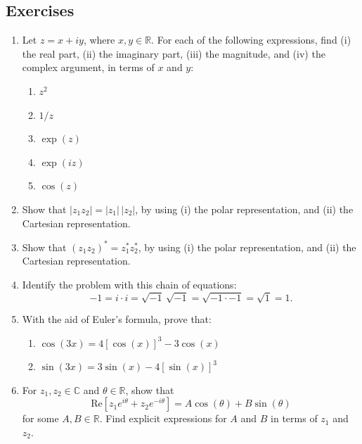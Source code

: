 \documentclass[10pt,a4paper]{article}
\begin{document}
     
\subsection{Exercises}

\begin{enumerate}
\item
  Let $z = x + iy$, where $x, y \in \mathbb{R}$. For each of the
  following expressions, find (i) the real part, (ii) the imaginary
  part, (iii) the magnitude, and (iv) the complex argument, in terms
  of $x$ and $y$:
  \begin{enumerate}
  \item $z^2$
  \item $1/z$
  \item $\exp(z)$
  \item $\exp(iz)$
  \item $\cos(z)$
  \end{enumerate}
  
\item
  Show that $|z_1 z_2| = |z_1|\, |z_2|$, by using (i) the polar
  representation, and (ii) the Cartesian representation.

\item
  Show that $(z_1 z_2)^* = z_1^* z_2^*$, by using (i) the polar
  representation, and (ii) the Cartesian representation.

\item Identify the problem with this chain of equations:
  \begin{equation*}
    -1 = i \cdot i = \sqrt{-1}\,\sqrt{-1} = \sqrt{-1 \cdot -1} = \sqrt{1} = 1.
  \end{equation*}

\item With the aid of Euler's formula, prove that:
  \begin{enumerate}
  \item $\cos(3x) = 4[\cos(x)]^3 -3\cos(x)$
  \item $\sin(3x) = 3\sin(x)-4[\sin(x)]^3$
  \end{enumerate}

\item
  For $z_1, z_2 \in \mathbb{C}$ and $\theta \in \mathbb{R}$, show that
  \begin{equation}
    \mathrm{Re}\left[z_1 e^{i\theta} + z_2 e^{-i\theta}\right] = A \cos(\theta) + B \sin(\theta)
  \end{equation}
  for some $A, B \in \mathbb{R}$. Find explicit expressions for $A$
  and $B$ in terms of $z_1$ and $z_2$.


\end{enumerate}
\end{document}
